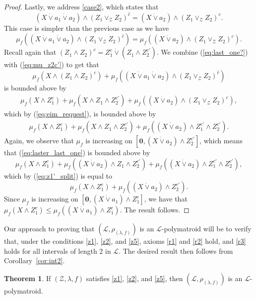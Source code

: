 \documentclass[a4paper,11pt,reqno]{article}
\theoremstyle{definition}
\newtheorem{theorem}{Theorem}[section]
\newcommand{\zero}{{\mathbf{0}}}
\begin{document}
\begin{proof}
Lastly, we address \ref{case2}, which states that
$$(X\dot\vee a_1\dot\vee a_2)\wedge(Z_1\vee_\mathcal{Z} Z_2)^{\hat{c}}=(X\dot\vee a_2)\wedge(Z_1\vee_\mathcal{Z} Z_2)^c.$$
This case is simpler than the previous case as we have 
\begin{equation}\label{eq:last_one?}
    \mu_f((X\dot\vee a_1\dot\vee a_2)\wedge(Z_1\vee_\mathcal{Z} Z_2)^{\hat{c}})=\mu_f((X\dot\vee a_2)\wedge(Z_1\vee_\mathcal{Z} Z_2)^c).
\end{equation}
Recall again that $(Z_1\wedge Z_2)^c=Z_1^c\dot\vee(Z_1\wedge Z_2^{c'})$. We combine (\ref{eq:last_one?}) with (\ref{eq:mu_z2c'}) to get that 
$$\mu_f(X\wedge (Z_1\wedge Z_2)^c)+\mu_f((X\dot\vee a_1\dot\vee a_2)\wedge   (Z_1\vee_\mathcal{Z} Z_2)^{\hat{c}})$$
is bounded above by
\begin{align}\label{eq:last_one}
    \mu_f(X\wedge Z_1^c)+\mu_f(X\wedge Z_1\wedge Z_2^{c'})+\mu_f((X\dot\vee a_2)\wedge(Z_1\vee_\mathcal{Z} Z_2)^c),
\end{align}
which by (\ref{eq:eim_request}), is bounded above by
\begin{align}\label{eq:laster_last_one}
    \mu_f(X\wedge Z_1^c)+\mu_f(X\wedge Z_1\wedge Z_2^{c'})+\mu_f((X\dot\vee a_2)\wedge Z_1^{c'}\wedge Z_2^{c'}).
\end{align}
Again, we observe that $\mu_f$ is increasing on $[\zero,(X\dot\vee a_2)\wedge Z_2^{c'}]$, which means that (\ref{eq:laster_last_one}) is bounded above by
$$\mu_f(X\wedge Z_1^c)+\mu_f((X\dot\vee a_2)\wedge Z_1\wedge Z_2^{c'})+\mu_f((X\dot\vee a_2)\wedge Z_1^{c'}\wedge Z_2^{c'}),$$
which by (\ref{eq:z1'_split}) is equal to
$$\mu_f(X\wedge Z_1^c)+\mu_f((X\dot\vee a_2)\wedge Z_2^{c'}).$$
Since $\mu_f$ is increasing on $[\zero, (X\dot\vee a_1)\wedge Z_1^c]$, we have that $\mu_f(X\wedge Z_1^c)\leq\mu_f((X\dot\vee a_1)\wedge Z_1^c)$. The result follows.
\end{proof}



Our approach to proving that $(\mathcal{L},\rho_{(\lambda,f)})$ is an $\mathcal{L}$-polymatroid will be to verify that, under the conditions \ref{z1}, \ref{z2}, and \ref{z5}, axioms \ref{r1} and \ref{r2} hold, and \ref{r3} holds for all intervals of length 2 in $\mathcal{L}$. The desired result then follows from Corollary~\ref{cor:int2}.

\begin{theorem}\label{thm:axioms_imply_q-poly}
    If $(\mathcal{Z},\lambda,f)$ satisfies \ref{z1}, \ref{z2}, and \ref{z5}, then $(\mathcal{L},\rho_{(\lambda,f)})$ is an $\mathcal{L}$-polymatroid.
\end{theorem}
\end{document}

